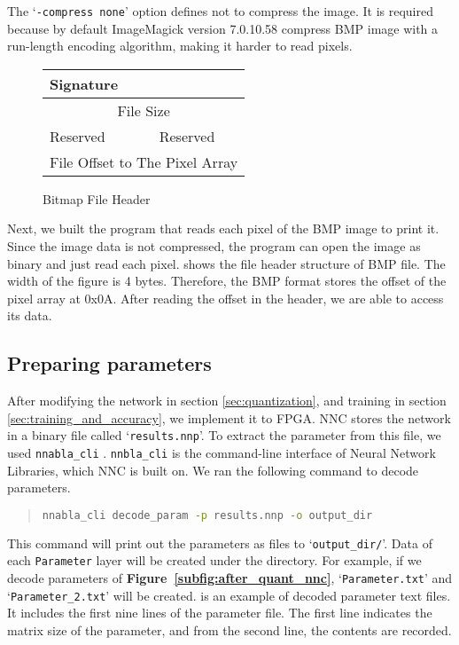 The `\texttt{-compress none}' option defines not to compress the image. It is required because by default ImageMagick version 7.0.10.58 compress BMP image with a run-length encoding algorithm, making it harder to read pixels.

\begin{figure}[tbp]
  \centering
    \begin{tabular}{|p{2cm}|p{2cm}|}
    \hline
     \hfil Signature & \hfil\\
    \hline
    \multicolumn{2}{|c|}{File Size}\\
    \hline
     \hfil Reserved & \hfil Reserved\\
    \hline
    \multicolumn{2}{|c|}{File Offset to The Pixel Array}\\
    \hline
   \end{tabular}
  \caption{Bitmap File Header}
  \label{fig:bmp_header}
\end{figure}

Next, we built the program that reads each pixel of the BMP image to print it. Since the image data is not compressed, the program can open the image as binary and just read each pixel.  shows the file header structure of BMP file. The width of the figure is 4 bytes. Therefore, the BMP format stores the offset of the pixel array at 0x0A. After reading the offset in the header, we are able to access its data.

\subsection{Preparing parameters}

After modifying the network in section \ref{sec:quantization}, and training in section \ref{sec:training_and_accuracy}, we implement it to FPGA. NNC stores the network in a binary file called `\texttt{results.nnp}'. To extract the parameter from this file, we used \texttt{nnabla\_cli} \cite{sony-nnabla}. \texttt{nnbla\_cli} is the command-line interface of Neural Network Libraries, which NNC is built on. We ran the following command to decode parameters.

\begin{quote}
  \begin{lstlisting}[language=bash, numbers=none, frame=l]
nnabla_cli decode_param -p results.nnp -o output_dir
  \end{lstlisting}
\end{quote}

This command will print out the parameters as files to `\texttt{output\_dir/}'. Data of each \texttt{Parameter} layer will be created under the directory. For example, if we decode parameters of \textbf{Figure~\ref{subfig:after_quant_nnc}}, `\texttt{Parameter.txt}' and `\texttt{Parameter\_2.txt}' will be created.  is an example of decoded parameter text files. It includes the first nine lines of the parameter file. The first line indicates the matrix size of the parameter, and from the second line, the contents are recorded.

